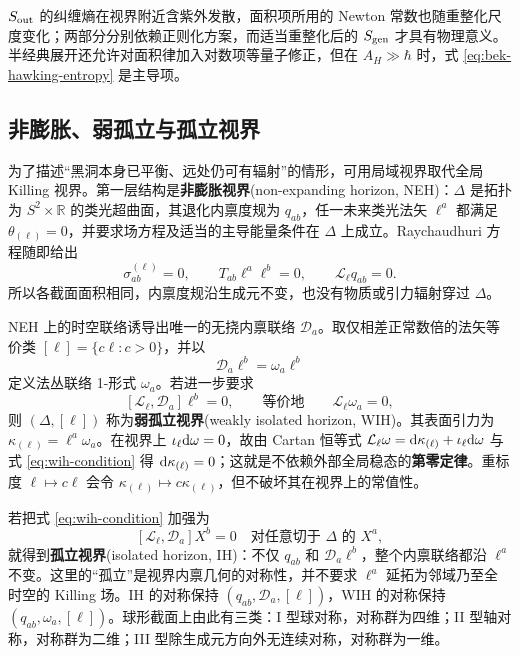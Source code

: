 $S_{\rm out}$ 的纠缠熵在视界附近含紫外发散，面积项所用的 Newton 常数也随重整化尺度变化；两部分分别依赖正则化方案，而适当重整化后的 $S_{\rm gen}$ 才具有物理意义。半经典展开还允许对面积律加入对数项等量子修正，但在 $A_H\gg\hbar$ 时，式 \eqref{eq:bek-hawking-entropy} 是主导项。

\subsection{非膨胀、弱孤立与孤立视界}

为了描述“黑洞本身已平衡、远处仍可有辐射”的情形，可用局域视界取代全局 Killing 视界。第一层结构是\textbf{非膨胀视界}(non-expanding horizon, NEH)：$\Delta$ 是拓扑为 $S^2\times\mathbb R$ 的类光超曲面，其退化内禀度规为 $q_{ab}$，任一未来类光法矢 $\ell^a$ 都满足 $\theta_{(\ell)}=0$，并要求场方程及适当的主导能量条件在 $\Delta$ 上成立。Raychaudhuri 方程随即给出
\[
    \sigma^{(\ell)}_{ab}=0,\qquad
    T_{ab}\ell^a\ell^b=0,\qquad
    \mathcal L_\ell q_{ab}=0.
\]
所以各截面面积相同，内禀度规沿生成元不变，也没有物质或引力辐射穿过 $\Delta$。

NEH 上的时空联络诱导出唯一的无挠内禀联络 $\mathcal D_a$。取仅相差正常数倍的法矢等价类 $[\ell]=\{c\ell:c>0\}$，并以
\[
    \mathcal D_a\ell^b=\omega_a\ell^b
\]
定义法丛联络 1-形式 $\omega_a$。若进一步要求
\begin{equation}\label{eq:wih-condition}
    [\mathcal L_\ell,\mathcal D_a]\ell^b=0,
    \qquad\text{等价地}\qquad
    \mathcal L_\ell\omega_a=0,
\end{equation}
则 $(\Delta,[\ell])$ 称为\textbf{弱孤立视界}(weakly isolated horizon, WIH)。其表面引力为 $\kappa_{(\ell)}=\ell^a\omega_a$。在视界上 $\iota_\ell\dd\omega=0$，故由 Cartan 恒等式 $\mathcal L_\ell\omega=\dd\kappa_{(\ell)}+\iota_\ell\dd\omega$ 与式 \eqref{eq:wih-condition} 得 $\dd\kappa_{(\ell)}=0$；这就是不依赖外部全局稳态的\textbf{第零定律}。重标度 $\ell\mapsto c\ell$ 会令 $\kappa_{(\ell)}\mapsto c\kappa_{(\ell)}$，但不破坏其在视界上的常值性。

若把式 \eqref{eq:wih-condition} 加强为
\[
    [\mathcal L_\ell,\mathcal D_a]X^b=0
    \quad\text{对任意切于 }\Delta\text{ 的 }X^a,
\]
就得到\textbf{孤立视界}(isolated horizon, IH)：不仅 $q_{ab}$ 和 $\mathcal D_a\ell^b$，整个内禀联络都沿 $\ell^a$ 不变。这里的“孤立”是视界内禀几何的对称性，并不要求 $\ell^a$ 延拓为邻域乃至全时空的 Killing 场。IH 的对称保持 $(q_{ab},\mathcal D_a,[\ell])$，WIH 的对称保持 $(q_{ab},\omega_a,[\ell])$。球形截面上由此有三类：I 型球对称，对称群为四维；II 型轴对称，对称群为二维；III 型除生成元方向外无连续对称，对称群为一维。

